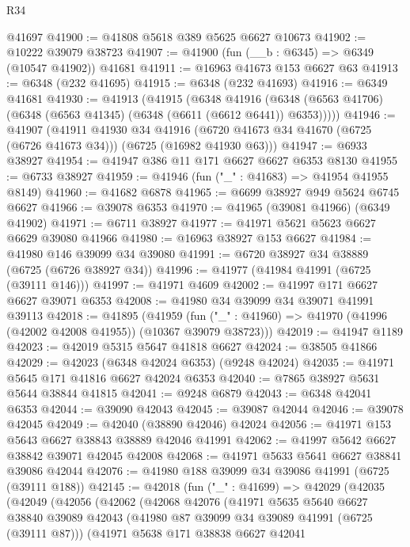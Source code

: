 \begin{lexlean}{R34}
\begin{coremodule}
    @41697
@41900 := @41808 @5618 @389 @5625 @6627 @10673
@41902 := @10222 @39079 @38723
@41907 := @41900 (fun (__b : @6345) => @6349 (@10547 @41902)) @41681
@41911 := @16963 @41673 @153 @6627 @63
@41913 := @6348 (@232 @41695)
@41915 := @6348 (@232 @41693)
@41916 := @6349 @41681
@41930 := @41913
    (@41915
      (@6348
        @41916
        (@6348 (@6563 @41706) (@6348 (@6563 @41345) (@6348 (@6611 (@6612 @6441)) @6353)))))
@41946 := @41907
    (@41911
      @41930
      @34
      @41916
      (@6720 @41673 @34 @41670 (@6725 (@6726 @41673 @34)))
      (@6725 (@16982 @41930 @63)))
@41947 := @6933 @38927
@41954 := @41947 @386 @11 @171 @6627 @6627 @6353 @8130
@41955 := @6733 @38927
@41959 := @41946 (fun ("_" : @41683) => @41954 @41955 @8149)
@41960 := @41682 @6878
@41965 := @6699 @38927 @949 @5624 @6745 @6627
@41966 := @39078 @6353
@41970 := @41965 (@39081 @41966) (@6349 @41902)
@41971 := @6711 @38927
@41977 := @41971 @5621 @5623 @6627 @6629 @39080 @41966
@41980 := @16963 @38927 @153 @6627
@41984 := @41980 @146 @39099 @34 @39080
@41991 := @6720 @38927 @34 @38889 (@6725 (@6726 @38927 @34))
@41996 := @41977 (@41984 @41991 (@6725 (@39111 @146)))
@41997 := @41971 @4609
@42002 := @41997 @171 @6627 @6627 @39071 @6353
@42008 := @41980 @34 @39099 @34 @39071 @41991 @39113
@42018 := @41895
    (@41959 (fun ("_" : @41960) => @41970 (@41996 (@42002 @42008 @41955)) (@10367 @39079 @38723)))
@42019 := @41947 @1189
@42023 := @42019 @5315 @5647 @41818 @6627
@42024 := @38505 @41866
@42029 := @42023 (@6348 @42024 @6353) (@9248 @42024)
@42035 := @41971 @5645 @171 @41816 @6627 @42024 @6353
@42040 := @7865 @38927 @5631 @5644 @38844 @41815
@42041 := @9248 @6879
@42043 := @6348 @42041 @6353
@42044 := @39090 @42043
@42045 := @39087 @42044
@42046 := @39078 @42045
@42049 := @42040 (@38890 @42046) @42024
@42056 := @41971 @153 @5643 @6627 @38843 @38889 @42046 @41991
@42062 := @41997 @5642 @6627 @38842 @39071 @42045 @42008
@42068 := @41971 @5633 @5641 @6627 @38841 @39086 @42044
@42076 := @41980 @188 @39099 @34 @39086 @41991 (@6725 (@39111 @188))
@42145 := @42018
    (fun ("_" : @41699) =>
    @42029
      (@42035
        (@42049
          (@42056
            (@42062
              (@42068
                @42076
                (@41971
                  @5635
                  @5640
                  @6627
                  @38840
                  @39089
                  @42043
                  (@41980 @87 @39099 @34 @39089 @41991 (@6725 (@39111 @87)))
                  (@41971
                    @5638
                    @171
                    @38838
                    @6627
                    @42041

\end{coremodule}
\end{lexlean}
